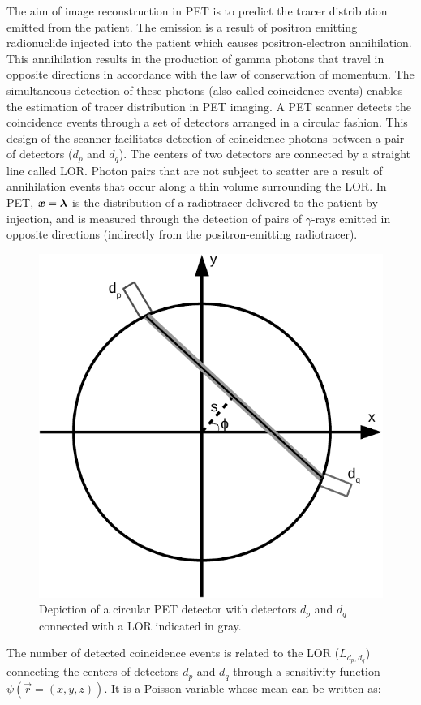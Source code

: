 The aim of image reconstruction in \ac{PET} is to predict the tracer distribution emitted from the patient. The emission is a result of positron emitting radionuclide injected into the patient which causes positron-electron annihilation. This annihilation results in the production of gamma photons that travel in opposite directions in accordance with the law of conservation of momentum. The simultaneous detection of these photons (also called coincidence events) enables the estimation of tracer distribution in \ac{PET} imaging. A \ac{PET} scanner detects the coincidence events through a set of detectors arranged in a circular fashion. This design of the scanner facilitates detection of coincidence photons between a pair of detectors ($d_p$ and $d_q$). The centers of two detectors are connected by a straight line called \ac{LOR}. Photon pairs that are not subject to scatter are a result of annihilation events that occur along a thin volume surrounding the \ac{LOR}. In \ac{PET}, $\bm{x} = \bm{\lambda}$ is the distribution of a radiotracer delivered to the patient by injection, and is measured through the detection of pairs of $\gamma$-rays emitted in opposite directions (indirectly from the positron-emitting radiotracer).

\begin{figure}[!htbp]
	\centering
	\includegraphics[width=0.6\linewidth]{./Figures/PET_det-crop.pdf}
	\caption{Depiction of a circular \ac{PET} detector with detectors $d_p$ and $d_q$ connected with a \ac{LOR} indicated in gray.}
	\label{fig:2dpet}
\end{figure}

The number of detected coincidence events is related to the \ac{LOR} ($L_{d_{p},d_{q}}$) connecting the centers of detectors $d_p$ and $d_q$ through a sensitivity function $\psi(\vec{r}=(x,y,z))$. It is a Poisson variable whose mean can be written as:

